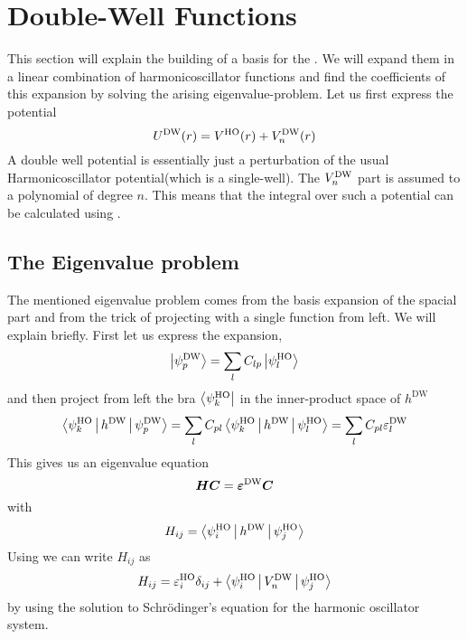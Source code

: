 \section{Double-Well Functions\label{sec:dwfunc}}
    This section will explain the building of a basis for the
    . We will expand them in a linear combination
    of harmonicoscillator functions and find the coefficients of this expansion
    by solving the arising eigenvalue-problem. Let us first express the
    potential
        \begin{equation}
            U^{\text{DW}}(r) = V^{\text{HO}}(r) + V^{\text{DW}}_n(r)
            \label{eq:UDW}
        \end{equation}
    A double well potential is essentially just a perturbation of the usual
    Harmonicoscillator potential(which is a single-well). The $V^{\text{DW}}_n$ part is
    assumed to a polynomial of degree $n$. This means that the integral over
    such a potential can be calculated using .

\subsection{The Eigenvalue problem}
    The mentioned eigenvalue problem comes from the basis expansion of the
    spacial part and from the trick of projecting with a single function from
    left. We will explain briefly. First let us express the expansion,
        \begin{equation}
            \ket{\psi^{\text{DW}}_p} = \sum\limits_{l}C_{lp}\ket{\psi^{\text{HO}}_l}
            \label{eq:dwexpansiondef}
        \end{equation}
    and then project from left the bra $\bra{\psi^{\text{HO}}_k}$ in the
    inner-product space of $h^{\text{DW}}$
        \begin{equation}
            \Braket{\psi^{\text{HO}}_k|h^{\text{DW}}|\psi^{\text{DW}}_p} =
            \sum\limits_{l}C_{pl}\Braket{\psi^{\text{HO}}_k|h^{\text{DW}}|\psi^{\text{HO}}_l} =
            \sum\limits_{l}C_{pl}\varepsilon^{\text{DW}}_l
        \end{equation}
    This gives us an eigenvalue equation
        \begin{equation}
            \boldsymbol{{H}}\boldsymbol{{C}} = \boldsymbol{{\varepsilon^{\text{DW}}}}\boldsymbol{{C}}
        \end{equation}
    with
        \begin{equation}
            H_{ij} = \Braket{\psi^{\text{HO}}_i|h^{\text{DW}}|\psi^{\text{HO}}_j}
        \end{equation}
    Using  we can write $H_{ij}$ as
        \begin{equation}
            H_{ij} = \varepsilon^{\text{HO}}_i\delta_{ij} +
            \Braket{\psi^{\text{HO}}_i|V^{\text{DW}}_n|\psi^{\text{HO}}_j}
            \label{eq:Heigdef}
        \end{equation}
    by using the solution to Schrödinger's equation for the harmonic oscillator
    system. \\

